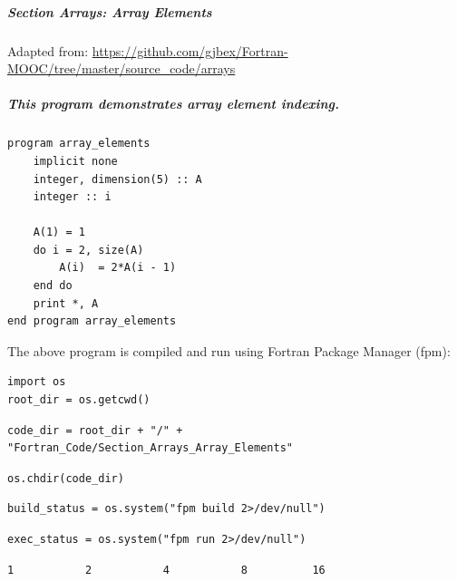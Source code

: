 \subparagraph{Section Arrays: Array Elements}

Adapted from: \href{https://github.com/gjbex/Fortran-MOOC/tree/master/source\_code/arrays}{https://github.com/gjbex/Fortran-MOOC/tree/master/source\_code/arrays}

\subparagraph{This program demonstrates array element indexing.}

\begin{verbatim}
program array_elements
    implicit none
    integer, dimension(5) :: A
    integer :: i

    A(1) = 1
    do i = 2, size(A)
        A(i)  = 2*A(i - 1)
    end do
    print *, A
end program array_elements
\end{verbatim}

The above program is compiled and run using Fortran Package Manager (fpm):

\begin{verbatim}
import os
root_dir = os.getcwd()
\end{verbatim}

\begin{verbatim}
code_dir = root_dir + "/" + "Fortran_Code/Section_Arrays_Array_Elements"
\end{verbatim}

\begin{verbatim}
os.chdir(code_dir)
\end{verbatim}

\begin{verbatim}
build_status = os.system("fpm build 2>/dev/null")
\end{verbatim}

\begin{verbatim}
exec_status = os.system("fpm run 2>/dev/null")
\end{verbatim}

\begin{verbatim}
1           2           4           8          16
\end{verbatim}